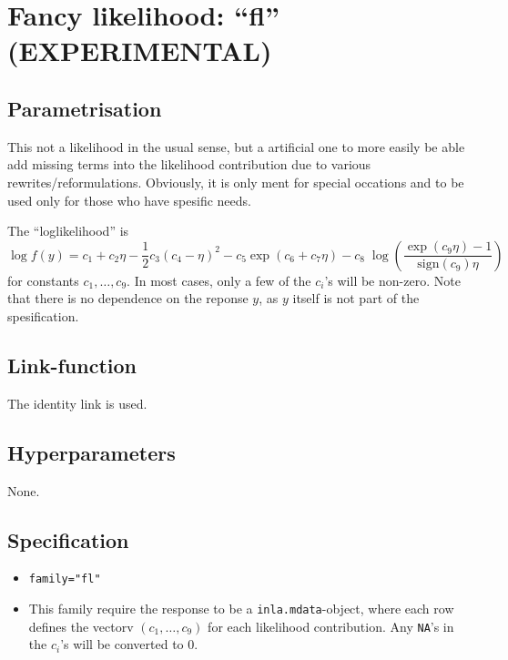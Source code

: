 \documentclass[a4paper,11pt]{article}
\begin{document}
\section*{Fancy likelihood: ``fl'' (EXPERIMENTAL)}

\subsection*{Parametrisation}

This not a likelihood in the usual sense, but a artificial one to more
easily be able add missing terms into the likelihood contribution due
to various rewrites/reformulations. Obviously, it is only ment for
special occations and to be used only for those who have spesific
needs.

The ``loglikelihood'' is
\begin{displaymath}
    \log f(y) = c_1 + c_2 \eta -\frac{1}{2} c_3 (c_4 - \eta)^{2} -
    c_5 \exp(c_6 + c_7 \eta) - c_8\;\log\left( \frac{\exp(c_9\eta)-1}{\text{sign}(c_9)\eta}\right)
\end{displaymath}
for constants $c_1, \ldots, c_{9}$. In most cases, only a few of the
$c_i$'s will be non-zero. Note that there is no dependence on the
reponse $y$, as $y$ itself is not part of the spesification.

\subsection*{Link-function}

The identity link is used.

\subsection*{Hyperparameters}

None.

\subsection*{Specification}

\begin{itemize}
\item \texttt{family="fl"}
\item This family require the response to be a
    \texttt{inla.mdata}-object, where each row defines the vectorv
    $(c_1, \ldots, c_{9})$ for each likelihood contribution. Any
    \texttt{NA}'s in the $c_i$'s will be converted to 0.
\end{itemize}
\end{document}
